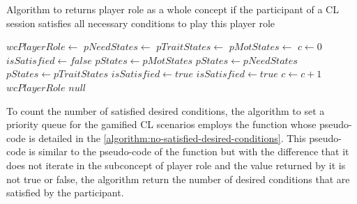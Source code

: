 \begin{algoritmo}
\caption{Algorithm to returns player role  as a whole concept if the participant  of a CL session  satisfies all necessary conditions to play this player role}
\label{algorithm:satisfy-necessary-conditions}
\begin{scriptsize}
\begin{algorithmic}[1]
  \State $wcPlayerRole \gets$ 
  \State $pNeedStates \gets$ 
  \State $pTraitStates \gets$ 
  \State $pMotStates \gets$   
    \State $c \gets 0$
      \State $isSatisfied \gets false$
         $pStates \gets pMotStates$
        \EndIf
         $pStates \gets pNeedStates$
        \EndIf
         $pStates \gets pTraitStates$
        \EndIf
         $isSatisfied \gets true$
        \Else
             $isSatisfied \gets true$
            \EndIf
          \EndFor
        \EndIf
      \EndFor
       $c \gets c+1$
      \EndIf
    \EndFor
      \State \Return $wcPlayerRole$
    \EndIf
  \EndFor
  \State \Return $null$
\EndFunction
\end{algorithmic}
\end{scriptsize}
\end{algoritmo}

To count the number of satisfied desired conditions, the algorithm to set a priority queue for the gamified CL scenarios employs the function  whose pseudo-code is detailed in the \autoref{algorithm:no-satisfied-desired-conditions}.
This pseudo-code is similar to the pseudo-code of the function  but with the difference that it does not iterate in the subconcept of player role and the value returned by it is not true or false, the algorithm return the number of desired conditions that are satisfied by the participant.

